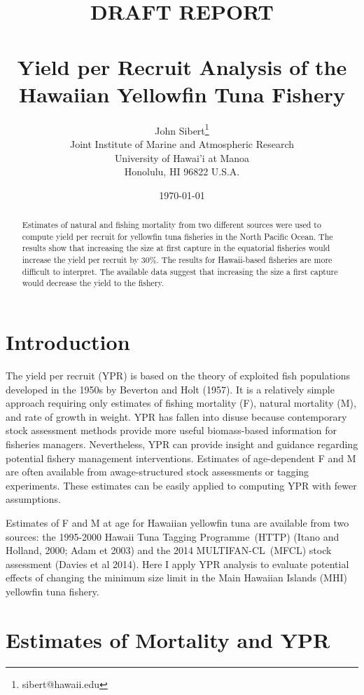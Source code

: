 \documentclass[12pt,letterpaper]{article}
\title{
{\bf\color{red}DRAFT REPORT\normalcolor}\\
~\\
Yield per Recruit Analysis of the Hawaiian
Yellowfin Tuna Fishery}
\author{
John Sibert\thanks{sibert@hawaii.edu}\\
Joint Institute of Marine and Atmospheric Research\\
University of Hawai'i at Manoa\\
Honolulu, HI  96822 U.S.A.\\[0.125in]
\date{\today}
}
\newcommand\doublespacing{\baselineskip=1.6\normalbaselineskip}
\newcommand\MFCL{MULTIFAN-CL}
\newcommand\HTTP{Hawaii Tuna Tagging Programme}
\begin{document}
\maketitle

\begin{abstract}
Estimates of natural and fishing mortality from two different sources
were used to compute yield per recruit for yellowfin tuna fisheries in
the North Pacific Ocean. The results show that increasing the size at
first capture in the equatorial fisheries would increase the yield per
recruit by 30\%. The results for Hawaii-based fisheries are more
difficult to interpret. The available data suggest that increasing the
size a first capture would decrease the yield to the fishery.
\end{abstract}


\section*{Introduction}
The yield per recruit (YPR) is based on the theory of exploited fish
populations developed in the 1950s
by Beverton and Holt (1957). It is a relatively simple
approach requiring only estimates of fishing mortality (F), natural
mortality (M), and rate of growth in weight. YPR has fallen into
disuse because contemporary stock assessment methods provide more useful
biomass-based
information for fisheries managers. 
Nevertheless, YPR can provide insight and guidance regarding potential
fishery management interventions.
Estimates of age-dependent F and M are often available from
awage-structured stock
assessments or tagging experiments. These estimates can be easily
applied to computing YPR with fewer assumptions. 

Estimates of F and M at age for Hawaiian yellowfin tuna are available
from two sources: the 1995-2000 \HTTP\ (HTTP) (Itano and Holland,
2000; Adam et 2003) and the
2014 \MFCL\ (MFCL) stock assessment (Davies et al 2014). Here I
apply YPR analysis to evaluate potential effects of changing the
minimum size limit in the Main Hawaiian Islands (MHI) yellowfin tuna
fishery.

\section*{Estimates of Mortality and YPR}
\end{document}
